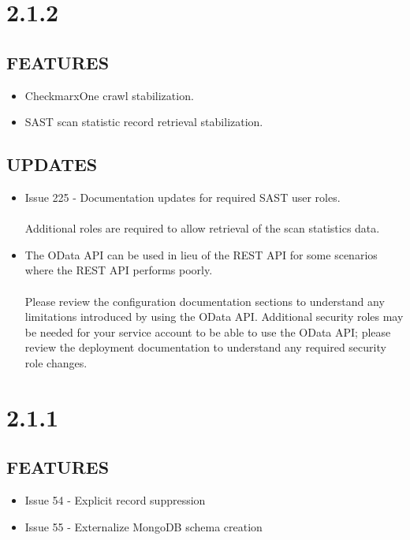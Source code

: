 \section{2.1.2}

\subsection*{FEATURES}
    \begin{itemize}
        \item CheckmarxOne crawl stabilization.
        \item SAST scan statistic record retrieval stabilization.
    \end{itemize}


\subsection*{UPDATES}
\begin{itemize}
    \item Issue 225 - Documentation updates for required SAST user roles.
    \\\\Additional roles are required to allow retrieval of the scan statistics data.

    \item The OData API can be used in lieu of the REST API for some scenarios where the
    REST API performs poorly.
    \\\\Please review the configuration documentation sections to understand any limitations
    introduced by using the OData API.  Additional security roles may be needed for
    your service account to be able to use the OData API; please review the deployment
    documentation to understand any required security role changes.
\end{itemize}

\section{2.1.1}

\subsection*{FEATURES}
    \begin{itemize}
        \item Issue 54 - Explicit record suppression
        \item Issue 55 - Externalize MongoDB schema creation
    \end{itemize}

